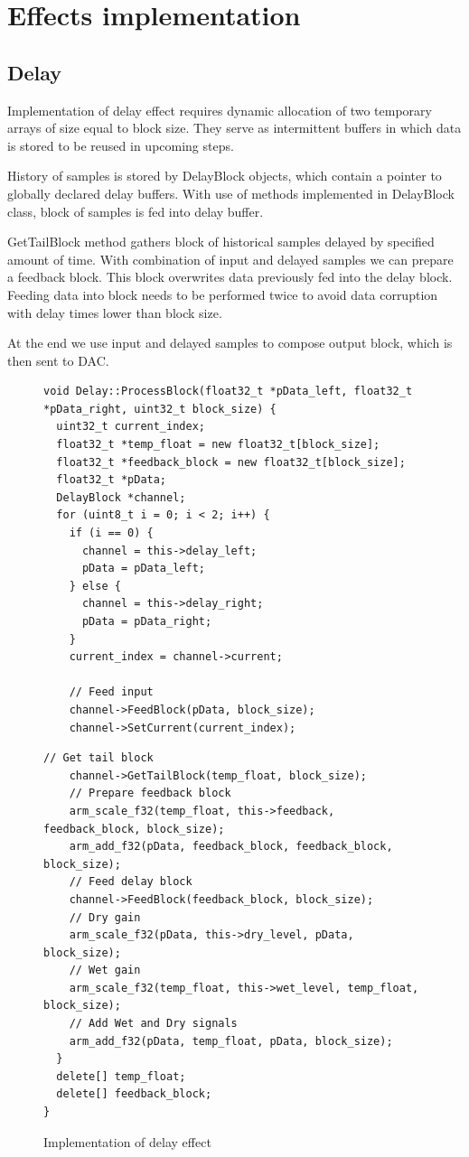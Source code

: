 \documentclass[a4paper,twoside,12pt]{book}
\begin{document}
\section{Effects implementation}

\subsection{Delay}
Implementation of delay effect requires dynamic allocation
of two temporary arrays of size equal to block size.
They serve as intermittent buffers in which data is stored
to be reused in upcoming steps.

History of samples is stored by DelayBlock objects,
which contain a pointer to globally declared delay buffers.
With use of methods implemented in DelayBlock class,
block of samples is fed into delay buffer.

GetTailBlock method gathers block of historical samples
delayed by specified amount of time.
With combination of input and delayed samples
we can prepare a feedback block.
This block overwrites data previously fed into the delay block.
Feeding data into block needs to be performed twice
to avoid data corruption with delay times lower than block size.

At the end we use input and delayed samples
to compose output block, which is then sent to DAC.

\begin{figure}[H]
\centering
\begin{lstlisting}
void Delay::ProcessBlock(float32_t *pData_left, float32_t *pData_right, uint32_t block_size) {
  uint32_t current_index;
  float32_t *temp_float = new float32_t[block_size];
  float32_t *feedback_block = new float32_t[block_size];
  float32_t *pData;
  DelayBlock *channel;
  for (uint8_t i = 0; i < 2; i++) {
    if (i == 0) {
      channel = this->delay_left;
      pData = pData_left;
    } else {
      channel = this->delay_right;
      pData = pData_right;
    }
    current_index = channel->current;

    // Feed input
    channel->FeedBlock(pData, block_size);
    channel->SetCurrent(current_index);
\end{lstlisting}
\end{figure}
\newpage
\begin{figure}[H]
\begin{lstlisting}[firstnumber=20]
    // Get tail block
    channel->GetTailBlock(temp_float, block_size);
    // Prepare feedback block
    arm_scale_f32(temp_float, this->feedback, feedback_block, block_size);
    arm_add_f32(pData, feedback_block, feedback_block, block_size);
    // Feed delay block
    channel->FeedBlock(feedback_block, block_size);
    // Dry gain
    arm_scale_f32(pData, this->dry_level, pData, block_size);
    // Wet gain
    arm_scale_f32(temp_float, this->wet_level, temp_float, block_size);
    // Add Wet and Dry signals
    arm_add_f32(pData, temp_float, pData, block_size);
  }
  delete[] temp_float;
  delete[] feedback_block;
}
\end{lstlisting}
\caption{Implementation of delay effect}
\label{fig:delay}
\end{figure}
\end{document}
